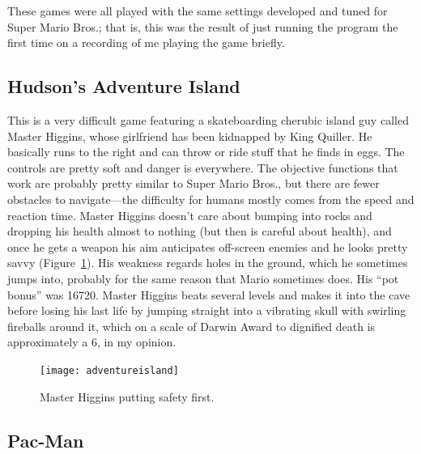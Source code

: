 \documentclass[twocolumn]{article}
\begin{document}
These games were all played with the same settings developed and tuned
for Super Mario Bros.; that is, this was the result of just running
the program the first time on a recording of me playing the game briefly.

\subsection{Hudson's Adventure Island}

This is a very difficult game featuring a skateboarding cherubic
island guy called Master Higgins, whose girlfriend has been kidnapped
by King Quiller. He basically runs to the right and can throw or ride
stuff that he finds in eggs. The controls are pretty soft and danger
is everywhere. The objective functions that work are probably pretty
similar to Super Mario Bros., but there are fewer obstacles to
navigate---the difficulty for humans mostly comes from the speed and
reaction time. Master Higgins doesn't care about bumping into rocks
and dropping his health almost to nothing (but then is careful about
health), and once he gets a weapon his aim anticipates off-screen
enemies and he looks pretty savvy (Figure~\ref{fig:adventureisland}).
His weakness regards holes in the ground, which he sometimes jumps
into, probably for the same reason that Mario sometimes does. His
``pot bonus'' was 16720. Master Higgins beats several levels and makes
it into the cave before losing his last life by jumping straight into
a vibrating skull with swirling fireballs around it, which on a scale
of Darwin Award to dignified death is approximately a 6, in my
opinion.

\begin{figure}[ht]
\begin{center}
\texttt{[image: adventureisland]}
\end{center}\vspace{-0.1in}
\caption{Master Higgins putting safety first.}
\label{fig:adventureisland}
\end{figure}

\subsection{Pac-Man}
\end{document}
